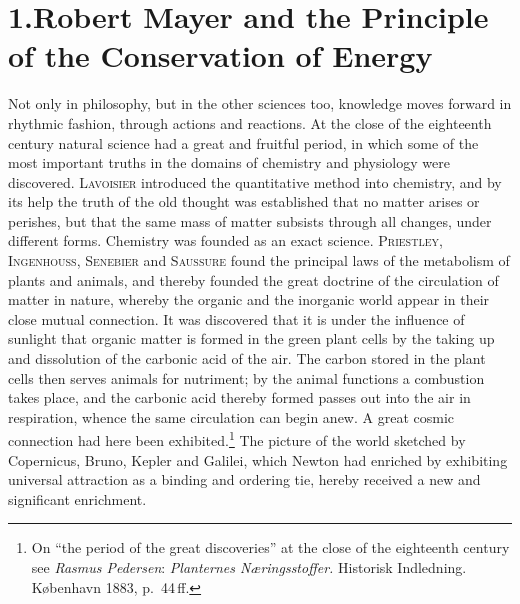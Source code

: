\documentclass[12pt,a4paper]{book}
\newcommand{\opage}[1]{\marginnote{\footnotesize\textit{[#1]}}}
\begin{document}
\section*{1.\quad Robert Mayer and the Principle of the Conservation of Energy}
\label{sec:mayer}

\opage{495}Not only in philosophy, but in the other sciences too, knowledge moves forward
in rhythmic fashion, through actions and reactions. At the close of the
eighteenth century natural science had a great and fruitful period, in which
some of the most important truths in the domains of chemistry and physiology
were discovered. \textsc{Lavoisier} introduced the quantitative method into
chemistry, and by its help the truth of the old thought was established that no
matter arises or perishes, but that the same mass of matter subsists through all
changes, under different forms. Chemistry was founded as an exact science.
\textsc{Priestley}, \textsc{Ingenhouss}, \textsc{Senebier} and \textsc{Saussure}
found the principal laws of the metabolism of plants and animals, and thereby
founded the great doctrine of the circulation of matter in nature, whereby the
organic and the inorganic world appear in their close mutual connection. It was
discovered that it is under the influence of sunlight that organic matter is
formed in the green plant cells by the taking up and dissolution of the carbonic
acid of the air. The carbon stored in the plant cells then serves animals for
nutriment; by the animal functions a combustion takes place, and the carbonic
acid thereby formed passes out into the air in respiration, whence the same
circulation can begin anew. A great cosmic connection had here been
exhibited.\footnote{\opage{596}On ``the period of the great discoveries'' at the close of
the eighteenth century see \emph{Rasmus Pedersen}: \textit{Planternes Næringsstoffer.}
Historisk Indledning. København 1883, p.~44\,ff.} The picture of the world
sketched by Copernicus, Bruno, Kepler and Galilei, which Newton had enriched by
exhibiting universal attraction as a binding and ordering tie, hereby received a
new and significant enrichment.
\end{document}

